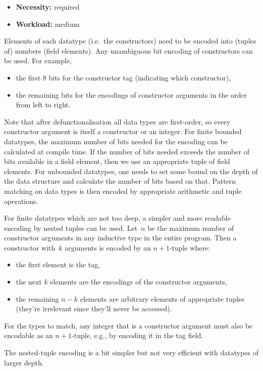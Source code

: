 \documentclass[
    9pt,            %
    techreport,        %
    affiltop,       %
]{art}
\begin{document}
\begin{itemize}
\item {\bf Necessity:} required
\item {\bf Workload:} medium
\end{itemize}

Elements of each datatype (i.e.~the constructors) need to be encoded
into (tuples of) numbers (field elements). Any unambiguous bit
encoding of constructors can be used. For example,
\begin{itemize}
\item the first 8 bits for the constructor tag (indicating which
  constructor),
\item the remaining bits for the encodings of constructor arguments in
  the order from left to right.
\end{itemize}
Note that after defunctionalisation all data types are first-order, so
every constructor argument is itself a constructor or an integer. For finite bounded datatypes, the maximum number of bits
needed for the encoding can be calculated at compile time. If the
number of bits needed exceeds the number of bits available in a field
element, then we use an appropriate tuple of field elements. For
unbounded datatypes, one needs to set some bound on the depth of the
data structure and calculate the number of bits based on that. Pattern
matching on data types is then encoded by appropriate arithmetic and
tuple operations.

For finite datatypes which are not too deep, a simpler and more
readable encoding by nested tuples can be used. Let~$n$ be the maximum
number of constructor arguments in any inductive type in the entire
program. Then a constructor with~$k$ arguments is encoded by an
$n+1$-tuple where:
\begin{itemize}
\item the first element is the tag,
\item the next $k$ elements are the encodings of the constructor arguments,
\item the remaining $n - k$ elements are arbitrary elements of
  appropriate tuples (they're irrelevant since they'll never be
  accessed).
\end{itemize}
For the types to match, any integer that is a constructor argument must also be encodable as an $n+1$-tuple, e.g., by encoding it in the tag field.

The nested-tuple encoding is a bit simpler but not very efficient with
datatypes of larger depth.
\end{document}
